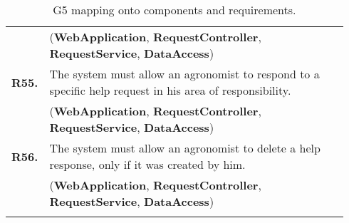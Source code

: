 \begin{longtable}{p{0.06\linewidth} p{0.88\linewidth}}
	& (\textbf{WebApplication}, \textbf{RequestController}, \textbf{RequestService}, \textbf{DataAccess})\\
	\textbf{R55.} & The system must allow an agronomist to respond to a specific help request in his area of responsibility.\\
	& (\textbf{WebApplication}, \textbf{RequestController}, \textbf{RequestService}, \textbf{DataAccess})\\
	\textbf{R56.} & The system must allow an agronomist to delete a help response, only if it was created by him.\\
	& (\textbf{WebApplication}, \textbf{RequestController}, \textbf{RequestService}, \textbf{DataAccess})\\

    \bottomrule
    \caption{G5 mapping onto components and requirements.}
\end{longtable}

